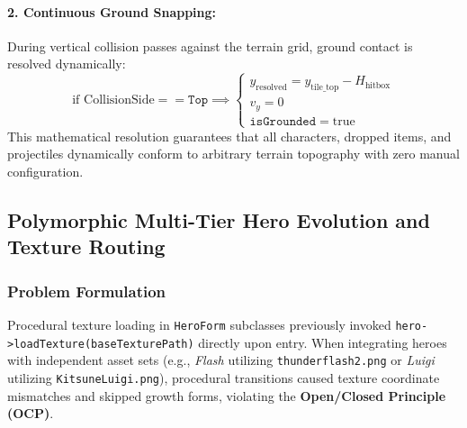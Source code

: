 \paragraph{2. Continuous Ground Snapping:} During vertical collision passes against the terrain grid, ground contact is resolved dynamically:
\begin{equation}
    \text{if } \text{CollisionSide} == \mathtt{Top} \implies 
    \begin{cases}
        y_{\text{resolved}} = y_{\text{tile\_top}} - H_{\text{hitbox}} \\
        v_y = 0 \\
        \mathtt{isGrounded} = \text{true}
    \end{cases}
\end{equation}
This mathematical resolution guarantees that all characters, dropped items, and projectiles dynamically conform to arbitrary terrain topography with zero manual configuration.

\subsection{Polymorphic Multi-Tier Hero Evolution and Texture Routing}
\label{subsec:polymorphic_evolution}

\subsubsection{Problem Formulation}
Procedural texture loading in \texttt{HeroForm} subclasses previously invoked \texttt{hero->loadTexture(baseTexturePath)} directly upon entry. When integrating heroes with independent asset sets (e.g., \textit{Flash} utilizing \texttt{thunderflash2.png} or \textit{Luigi} utilizing \texttt{KitsuneLuigi.png}), procedural transitions caused texture coordinate mismatches and skipped growth forms, violating the \textbf{Open/Closed Principle (OCP)}.

